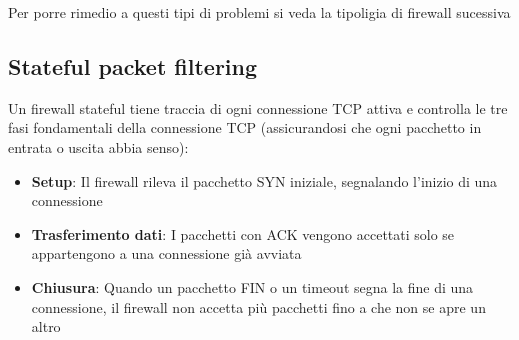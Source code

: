 Per porre rimedio a questi tipi di problemi si veda la tipoligia di firewall sucessiva

\subsection{Stateful packet filtering}
Un firewall stateful tiene traccia di ogni connessione TCP attiva e controlla le tre fasi fondamentali della connessione TCP (assicurandosi che ogni pacchetto in entrata o uscita abbia senso):
\begin{itemize}
    \item \textbf{Setup}: Il firewall rileva il pacchetto SYN iniziale, segnalando l'inizio di una connessione
    \item \textbf{Trasferimento dati}: I pacchetti con ACK vengono accettati solo se appartengono a una connessione già avviata
    \item \textbf{Chiusura}: Quando un pacchetto FIN o un timeout segna la fine di una connessione, il firewall non accetta più pacchetti fino a che non se apre un altro
\end{itemize} 

